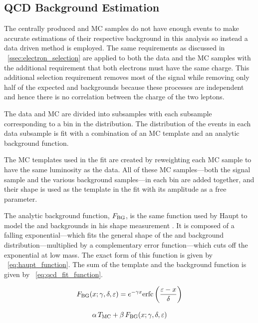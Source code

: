 \subsection{QCD Background Estimation}

The centrally produced \QCDjets and \wjets MC samples do not have enough events
to make accurate estimations of their respective background in this analysis so
instead a data driven method is employed. The same requirements as discussed in
\SEC~\ref{ssec:electron_selection} are applied to both the data and the MC
samples with the additional requirement that both electrons must have the same
charge. This additional selection requirement removes most of the signal while
removing only half of the expected \QCDjets and \wjets backgrounds because
these processes are independent and hence there is no correlation between the
charge of the two leptons.

The data and MC are divided into subsamples with each subsample corresponding
to a bin in the \phistar distribution. The \mee distribution of the events in
each data subsample is fit with a combination of an MC template and an analytic
background function.

The MC templates used in the fit are created by reweighting each MC sample to
have the same luminosity as the data. All of these MC samples---both the
\MADGRAPH signal sample and the various background samples---in each \phistar
bin are added together, and their shape is used as the template in the fit with
its amplitude as a free parameter.

The analytic background function, $F_{\text{BG}}$, is the same function used by
Haupt to model the \QCDjets and \wjets backgrounds in his \Ztoee shape
measurement \cite{haupt_2011}. It is composed of a falling exponential---which
fits the general shape of the \QCDjets and \wjets background
distribution---multiplied by a complementary error function---which cuts off
the exponential at low mass. The exact form of this function is given by
\EQ~\ref{eq:haupt_function}. The sum of the template and the background
function is given by \EQ~\ref{eq:qcd_fit_function}.

\begin{equation}\label{eq:haupt_function}
    F_{\text{BG}}(x; \gamma, \delta, \varepsilon) = e^{- \gamma x} {\mathrm{erfc}} \left( \frac{\varepsilon - x}{\delta} \right)
\end{equation}

\begin{equation}\label{eq:qcd_fit_function}
    \alpha \, T_{\text{MC}} + \beta \, F_{\text{BG}}(x; \gamma, \delta, \varepsilon)
\end{equation}

